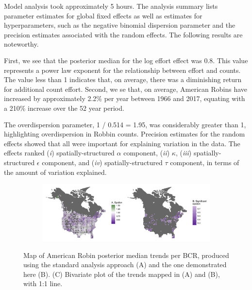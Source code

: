 \documentclass[]{article}
\begin{document}
Model analysis took approximately 5 hours.  The analysis summary lists parameter estimates for global fixed effects as well as estimates for hyperparameters, such as the negative binomial dispersion parameter and the precision estimates associated with the random effects. The following results are noteworthy.

First, we see that the posterior median for the log effort effect was 0.8. This value represents a power law exponent for the relationship between effort and counts.  The value less than 1 indicates that, on average, there was a diminishing return for additional count effort. Second, we se that, on average, American Robins have increased by approximately 2.2\% per year between 1966 and 2017, equating with a 210\% increase over the 52 year period. 

The overdispersion parameter, 1 / 0.514 = 1.95, was considerably greater than 1, highlighting overdispersion in Robbin counts. Precision estimates for the random effects showed that all were important for explaining variation in the data. The effects ranked (\textit{i}) spatially-structured $\alpha$ component, (\textit{ii}) $\kappa$, (\textit{iii}) spatially-structured $\epsilon$ component, and (\textit{iv}) spatially-structured $\tau$ component, in terms of the amount of variation explained. 

\begin{figure}[t]
  \centering
  \begin{subfigure}[t]{0.99\textwidth}
    \centering
    \includegraphics[width=\textwidth]{eps} 
  \end{subfigure}
  \caption{Map of American Robin posterior median trends per BCR, produced using the standard analysis approach (A) and the one demonstrated here (B). (C) Bivariate plot of the trends mapped in (A) and (B), with 1:1 line.}
\end{figure}
\end{document}
